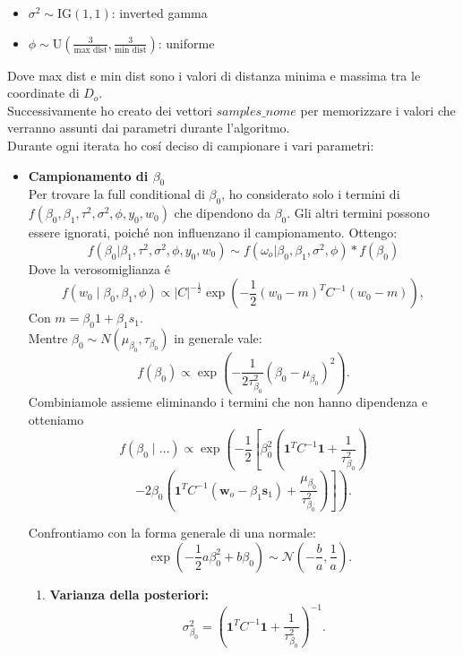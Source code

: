 \documentclass[a4paper,12pt]{article}
\begin{document}
\begin{itemize}
\begin{itemize}
			\item $\sigma^2 \sim \text{IG}(1, 1)$: inverted gamma
			\item $\phi \sim \text{U}(\frac{3}{\text{max dist}}, \frac{3}{\text{min dist}})$: uniforme
		\end{itemize}
		Dove max dist e min dist sono i valori di distanza minima e massima tra le coordinate di $D_o$.\\
		Successivamente ho creato dei vettori $samples \_ nome$ per memorizzare i valori che verranno assunti dai parametri durante l'algoritmo.\\
		Durante ogni iterata ho cosí deciso di campionare i vari parametri:
		\begin{itemize}
			\item \textbf{Campionamento di $\beta_0$}\\
			Per trovare la full conditional di \( \beta_0 \), ho considerato solo i termini di \( f(\beta_0,\beta_1,\tau^2,\sigma^2,\phi , y_0,w_0) \) che dipendono da \( \beta_0 \). Gli altri termini possono essere ignorati, poiché non influenzano il campionamento. Ottengo:
			\[
			f(\beta_0|\beta_1,\tau^2,\sigma^2,\phi , y_0,w_0) \sim f(\omega_o | \beta_0,\beta_1,\sigma^2,\phi)*f(\beta_0)
			\]
			Dove la verosomiglianza é
			\[
			f(w_0 \mid \beta_0, \beta_1, \phi) \propto |C|^{-\frac{1}{2}} \exp \left( -\frac{1}{2} (w_0 - m )^T C^{-1} (w_0 - m) \right),
			\]
			Con $m=\beta_0 1 + \beta_1 s_1$.\\
			Mentre $\beta_0 \sim N(\mu_{\beta_0},\tau_{\beta_0})$ in generale vale:
			\[
			f(\beta_0) \propto \exp \left( -\frac{1}{2\tau_{\beta_0}^2} (\beta_0 - \mu_{\beta_0})^2 \right).
			\]
			Combiniamole assieme eliminando i termini che non hanno dipendenza e otteniamo
			\[
			f(\beta_0 \mid \dots) \propto \exp \left( 
			-\frac{1}{2} \left[
			\beta_0^2 \left( \mathbf{1}^T C^{-1} \mathbf{1} + \frac{1}{\tau_{\beta_0}^2} \right) \right. \right.
			\]
			\[
			\left. \left. 
			- 2\beta_0 \left( \mathbf{1}^T C^{-1} (\mathbf{w}_o - \beta_1 \mathbf{s}_1) 
			+ \frac{\mu_{\beta_0}}{\tau_{\beta_0}^2} \right)
			\right]
			\right).
			\]
			
			
			Confrontiamo con la forma generale di una normale:
			\[
		    \quad 
			\exp \left( -\frac{1}{2} a \beta_0^2 + b \beta_0 \right) \sim \mathcal{N} \left( -\frac{b}{a}, \frac{1}{a} \right).
			\]
			
			\begin{enumerate}
				\item \textbf{Varianza della posteriori:}
				\[
				\sigma_{\beta_0}^2 = \left( \mathbf{1}^T C^{-1} \mathbf{1} + \frac{1}{\tau_{\beta_0}^2} \right)^{-1}.
				\]
				

\end{enumerate}
\end{itemize}
\end{itemize}
\end{document}

